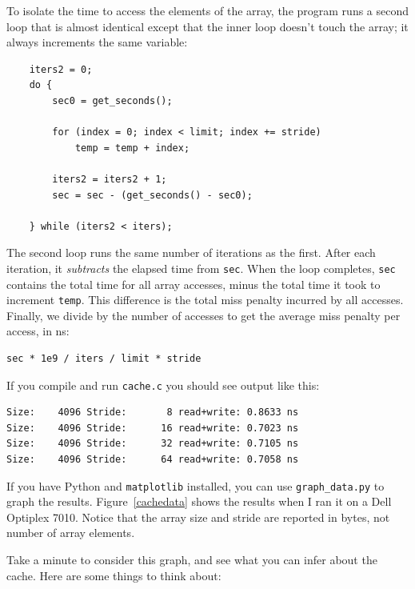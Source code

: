 \documentclass[12pt]{book}
\begin{document}
To isolate the time to access the elements of the array,
the program runs a second loop that is almost identical except
that the inner loop doesn't touch the array; it always increments
the same variable:

\begin{verbatim}
    iters2 = 0;
    do {
        sec0 = get_seconds();
        
        for (index = 0; index < limit; index += stride) 
            temp = temp + index;
        
        iters2 = iters2 + 1;
        sec = sec - (get_seconds() - sec0);

    } while (iters2 < iters);
\end{verbatim}

The second loop runs the same number of iterations as the first.
After each iteration, it {\em subtracts} the elapsed time from
{\tt sec}.  When the loop completes, {\tt sec} contains the total
time for all array accesses, minus the total time it took to increment
{\tt temp}.  This difference is the total miss penalty incurred by
all accesses.  Finally, we divide by the number of accesses to
get the average miss penalty per access, in ns:

\begin{verbatim}
sec * 1e9 / iters / limit * stride
\end{verbatim}

If you compile and run {\tt cache.c} you should see output like this:

\begin{verbatim}
Size:    4096 Stride:       8 read+write: 0.8633 ns
Size:    4096 Stride:      16 read+write: 0.7023 ns
Size:    4096 Stride:      32 read+write: 0.7105 ns
Size:    4096 Stride:      64 read+write: 0.7058 ns
\end{verbatim}

If you have Python and {\tt matplotlib} installed, you can use
\verb"graph_data.py" to graph the results.  Figure~\ref{cachedata}
shows the results when I ran it on a Dell Optiplex 7010.
Notice that the array size and stride are reported in
bytes, not number of array elements.

Take a minute to consider this graph, and see what you can infer
about the cache.  Here are some things to think about:
\end{document}
